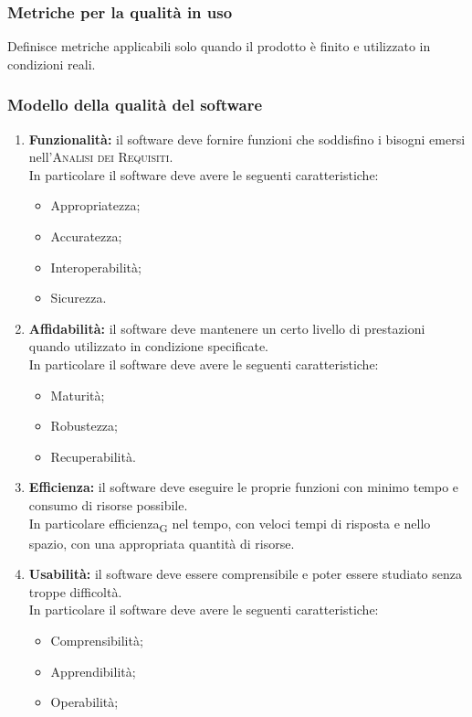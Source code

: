 \subsubsection{Metriche per la qualità in uso}
Definisce metriche applicabili solo quando il prodotto è finito e utilizzato in condizioni reali.
\subsubsection{Modello della qualità del software}
\begin{enumerate}
	\item \textbf{Funzionalità:} il software deve fornire funzioni che soddisfino i bisogni emersi nell'\textsc{Analisi dei Requisiti}.\\In particolare il software deve avere le seguenti caratteristiche:
		\begin{itemize}
			\item Appropriatezza;
			\item Accuratezza;
			\item Interoperabilità;
			\item Sicurezza.
		\end{itemize}
	\item \textbf{Affidabilità:} il software deve mantenere un certo livello di prestazioni quando utilizzato in condizione specificate.\\In particolare il software deve avere le seguenti caratteristiche:
		\begin{itemize}
			\item Maturità;
			\item Robustezza;
			\item Recuperabilità.
		\end{itemize}
	\item \textbf{Efficienza:} il software deve eseguire le proprie funzioni con minimo tempo e consumo di risorse possibile.\\In particolare efficienza\textsubscript{G} nel tempo, con veloci tempi di risposta e nello spazio, con una appropriata quantità di risorse.
	\item \textbf{Usabilità:} il software deve essere comprensibile e poter essere studiato senza troppe difficoltà.\\In particolare il software deve avere le seguenti caratteristiche:
		\begin{itemize}
			\item Comprensibilità;
			\item Apprendibilità;
			\item Operabilità;

\end{itemize}
\end{enumerate}
